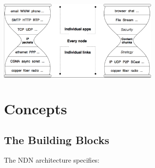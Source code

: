         \begin{center}\includegraphics[width=0.6\textwidth]{media/ndn_hourglass2.png}\end{center}

    \section{Concepts}
        \subsection{The Building Blocks}
            The NDN architecture specifies:
